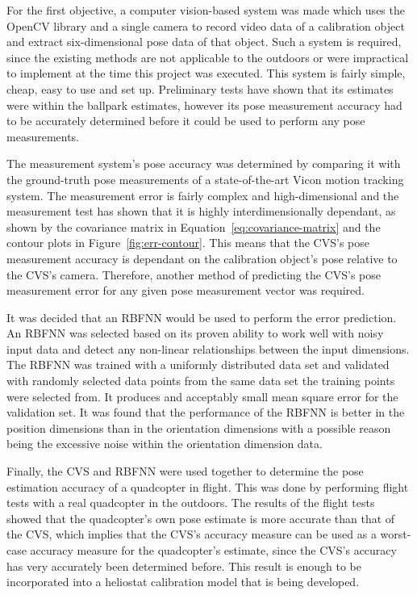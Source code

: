 For the first objective, a computer vision-based system was made which uses the OpenCV library and a single camera to record video data of a calibration object and extract six-dimensional pose data of that object. Such a system is required, since the existing methods are not applicable to the outdoors or were impractical to implement at the time this project was executed. This system is fairly simple, cheap, easy to use and set up. Preliminary tests have shown that its estimates were within the ballpark estimates, however its pose measurement accuracy had to be accurately determined before it could be used to perform any pose measurements. 

The measurement system's pose accuracy was determined by comparing it with the ground-truth pose measurements of a state-of-the-art Vicon motion tracking system. The measurement error is fairly complex and high-dimensional and the measurement test has shown that it is highly interdimensionally dependant, as shown by the covariance matrix in Equation~\ref{eq:covariance-matrix} and the contour plots in Figure~\ref{fig:err-contour}. This means that the CVS's pose measurement accuracy is dependant on the calibration object's pose relative to the CVS's camera. Therefore, another method of predicting the CVS's pose measurement error for any given pose measurement vector was required.

It was decided that an RBFNN would be used to perform the error prediction. An RBFNN was selected based on its proven ability to work well with noisy input data and detect any non-linear relationships between the input dimensions. The RBFNN was trained with a uniformly distributed data set and validated with randomly selected data points from the same data set the training points were selected from. It produces and acceptably small mean square error for the validation set. It was found that the performance of the RBFNN is better in the position dimensions than in the orientation dimensions with a possible reason being the excessive noise within the orientation dimension data. 

Finally, the CVS and RBFNN were used together to determine the pose estimation accuracy of a quadcopter in flight. This was done by performing flight tests with a real quadcopter in the outdoors. The results of the flight tests showed that the quadcopter's own pose estimate is more accurate than that of the CVS, which implies that the CVS's accuracy measure can be used as a worst-case accuracy measure for the quadcopter's estimate, since the CVS's accuracy has very accurately been determined before. This result is enough to be incorporated into a heliostat calibration model that is being developed. 


